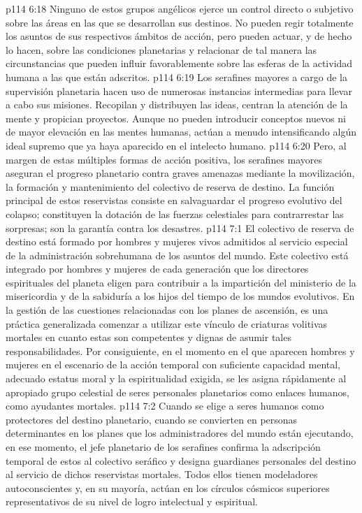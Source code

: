 \vs p114 6:18 Ninguno de estos grupos angélicos ejerce un control directo o subjetivo sobre las áreas en las que se desarrollan sus destinos. No pueden regir totalmente los asuntos de sus respectivos ámbitos de acción, pero pueden actuar, y de hecho lo hacen, sobre las condiciones planetarias y relacionar de tal manera las circunstancias que pueden influir favorablemente sobre las esferas de la actividad humana a las que están adscritos.
\vs p114 6:19 Los serafines mayores a cargo de la supervisión planetaria hacen uso de numerosas instancias intermedias para llevar a cabo sus misiones. Recopilan y distribuyen las ideas, centran la atención de la mente y propician proyectos. Aunque no pueden introducir conceptos nuevos ni de mayor elevación en las mentes humanas, actúan a menudo intensificando algún ideal supremo que ya haya aparecido en el intelecto humano.
\vs p114 6:20 Pero, al margen de estas múltiples formas de acción positiva, los serafines mayores aseguran el progreso planetario contra graves amenazas mediante la movilización, la formación y mantenimiento del colectivo de reserva de destino. La función principal de estos reservistas consiste en salvaguardar el progreso evolutivo del colapso; constituyen la dotación de las fuerzas celestiales para contrarrestar las sorpresas; son la garantía contra los desastres.
\vs p114 7:1 El colectivo de reserva de destino está formado por hombres y mujeres vivos admitidos al servicio especial de la administración sobrehumana de los asuntos del mundo. Este colectivo está integrado por hombres y mujeres de cada generación que los directores espirituales del planeta eligen para contribuir a la impartición del ministerio de la misericordia y de la sabiduría a los hijos del tiempo de los mundos evolutivos. En la gestión de las cuestiones relacionadas con los planes de ascensión, es una práctica generalizada comenzar a utilizar este vínculo de criaturas volitivas mortales en cuanto estas son competentes y dignas de asumir tales responsabilidades. Por consiguiente, en el momento en el que aparecen hombres y mujeres en el escenario de la acción temporal con suficiente capacidad mental, adecuado estatus moral y la espiritualidad exigida, se les asigna rápidamente al apropiado grupo celestial de seres personales planetarios como enlaces humanos, como ayudantes mortales.
\vs p114 7:2 Cuando se elige a seres humanos como protectores del destino planetario, cuando se convierten en personas determinantes en los planes que los administradores del mundo están ejecutando, en ese momento, el jefe planetario de los serafines confirma la adscripción temporal de estos al colectivo seráfico y designa guardianes personales del destino al servicio de dichos reservistas mortales. Todos ellos tienen modeladores autoconscientes y, en su mayoría, actúan en los círculos cósmicos superiores representativos de su nivel de logro intelectual y espiritual.
